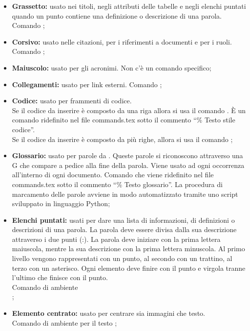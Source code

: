 \begin{itemize}
	\item \textbf{Grassetto:} usato nei titoli, negli attributi delle tabelle e negli elenchi puntati quando un punto contiene una definizione o descrizione di una parola. Comando ;
	\item \textbf{Corsivo:} usato nelle citazioni, per i riferimenti a documenti e per i ruoli. Comando ;
	\item \textbf{Maiuscolo:} usato per gli acronimi. Non c'è un comando specifico;
	\item \textbf{Collegamenti:} usato per link esterni. Comando ;
	\item \textbf{Codice:} usato per frammenti di codice.\\
	Se il codice da inserire è composto da una riga allora si usa il comando . \`E un comando ridefinito nel file commands.tex sotto il commento “\% Testo stile codice”.\\
	Se il codice da inserire è composto da più righe, allora si usa il comando ;
	\item \textbf{Glossario:} usato per parole da \docNameVersionGlo{}. Queste parole si riconoscono attraverso una G che compare a pedice alla fine della parola. Viene usato ad ogni occorrenza all'interno di ogni documento. Comando  che viene ridefinito nel file commands.tex sotto il commento “\% Testo glossario”. La procedura di marcamento delle parole avviene in modo automatizzato tramite uno script sviluppato in linguaggio Python;
	\item \textbf{Elenchi puntati:} usati per dare una lista di informazioni, di definizioni o descrizioni di una parola. La parola deve essere divisa dalla sua descrizione attraverso i due punti (:). La parola deve iniziare con la prima lettera maiuscola, mentre la sua descrizione con la prima lettera minuscola. Al primo livello vengono rappresentati con un punto, al secondo con un trattino, al terzo con un asterisco. Ogni elemento deve finire con il punto e virgola tranne l'ultimo che finisce con il punto. \\Comando di ambiente\\ ;
	\item \textbf{Elemento centrato:} usato per centrare sia immagini che testo.\\ Comando di ambiente per il testo ;

\end{itemize}
